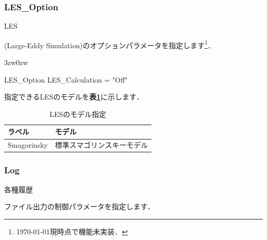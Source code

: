 \pagebreak
\subsubsection{LES\_Option}

\hypertarget{tgt:les_option}{LES}(Large-Eddy Simulation)のオプションパラメータを指定します\footnote{\today 現時点で機能未実装．}．

\begin{indentation}{3zw}{0zw}

{\small
\begin{program}
  LES_Option {
    LES_Calculation = "Off"
  }
\end{program}
}

指定できるLESのモデルを\textbf{表\ref{tbl:LES_model}}に示します．

\begin{table}[htdp]
\caption{LESのモデル指定}
\begin{center}
\small
\begin{tabular}{ll} \toprule
ラベル & モデル\\ \midrule
Smagorinsky & 標準スマゴリンスキーモデル\\ \bottomrule
\end{tabular}
\end{center}
\label{tbl:LES_model}
\end{table}

\end{indentation}



\pagebreak
\subsubsection{Log}

\hypertarget{tgt:log}{各種履歴}ファイル出力の制御パラメータを指定します．

